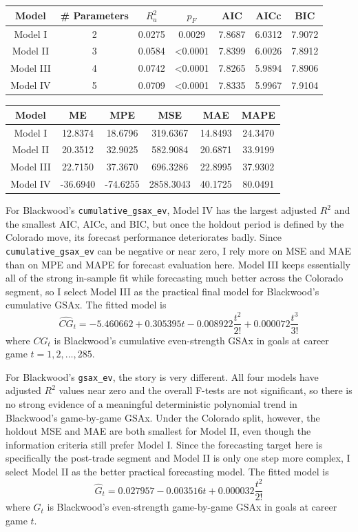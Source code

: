 \documentclass[
  10pt,
]{extarticle}
\begin{document}
\begin{center}
\normalsize

\begin{tabular}{ccccccc}
\toprule
Model & \# Parameters & $R_a^2$ & $p_F$ & AIC & AICc & BIC\\
\midrule
Model I & 2 & 0.0275 & 0.0029 & 7.8687 & 6.0312 & 7.9072\\
Model II & 3 & 0.0584 & <0.0001 & 7.8399 & 6.0026 & 7.8912\\
Model III & 4 & 0.0742 & <0.0001 & 7.8265 & 5.9894 & 7.8906\\
Model IV & 5 & 0.0709 & <0.0001 & 7.8335 & 5.9967 & 7.9104\\
\bottomrule
\end{tabular}
\normalsize
\end{center}
\begin{center}
\normalsize

\begin{tabular}{cccccc}
\toprule
Model & ME & MPE & MSE & MAE & MAPE\\
\midrule
Model I & 12.8374 & 18.6796 & 319.6367 & 14.8493 & 24.3470\\
Model II & 20.3512 & 32.9025 & 582.9084 & 20.6871 & 33.9199\\
Model III & 22.7150 & 37.3670 & 696.3286 & 22.8995 & 37.9302\\
Model IV & -36.6940 & -74.6255 & 2858.3043 & 40.1725 & 80.0491\\
\bottomrule
\end{tabular}
\normalsize
\end{center}

For Blackwood's \texttt{cumulative\_gsax\_ev}, Model IV has the largest adjusted \(R^2\) and the smallest AIC, AICc, and BIC, but once the holdout period is defined by the Colorado move, its forecast performance deteriorates badly. Since \texttt{cumulative\_gsax\_ev} can be negative or near zero, I rely more on MSE and MAE than on MPE and MAPE for forecast evaluation here. Model III keeps essentially all of the strong in-sample fit while forecasting much better across the Colorado segment, so I select Model III as the practical final model for Blackwood's cumulative GSAx. The fitted model is
\[
\widehat{CG}_t = -5.460662 + 0.305395 t - 0.008922 \frac{t^2}{2!} + 0.000072 \frac{t^3}{3!}
\]
where \(CG_t\) is Blackwood's cumulative even-strength GSAx in goals at career game \(t = 1, 2, \ldots, 285\).

For Blackwood's \texttt{gsax\_ev}, the story is very different. All four models have adjusted \(R^2\) values near zero and the overall F-tests are not significant, so there is no strong evidence of a meaningful deterministic polynomial trend in Blackwood's game-by-game GSAx. Under the Colorado split, however, the holdout MSE and MAE are both smallest for Model II, even though the information criteria still prefer Model I. Since the forecasting target here is specifically the post-trade segment and Model II is only one step more complex, I select Model II as the better practical forecasting model. The fitted model is
\[
\widehat{G}_t = 0.027957 - 0.003516 t + 0.000032 \frac{t^2}{2!}
\]
where \(G_t\) is Blackwood's even-strength game-by-game GSAx in goals at career game \(t\).
\end{document}
